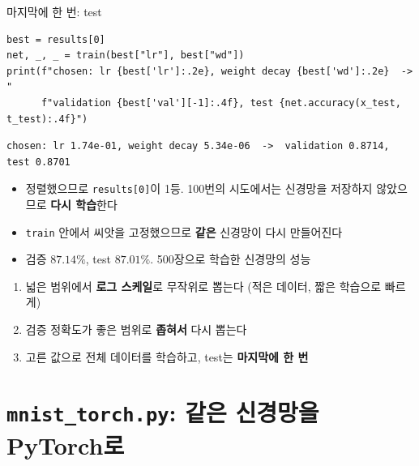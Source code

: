 \documentclass[aspectratio=169,11pt]{beamer}
\newcommand{\code}[1]{\texttt{#1}}
\begin{document}
\begin{frame}{마지막에 한 번: test}
\small
\begin{lstlisting}
best = results[0]
net, _, _ = train(best["lr"], best["wd"])
print(f"chosen: lr {best['lr']:.2e}, weight decay {best['wd']:.2e}  ->  "
      f"validation {best['val'][-1]:.4f}, test {net.accuracy(x_test, t_test):.4f}")
\end{lstlisting}
\begin{lstlisting}[style=outstyle]
chosen: lr 1.74e-01, weight decay 5.34e-06  ->  validation 0.8714, test 0.8701
\end{lstlisting}
\begin{itemize}
\item 정렬했으므로 \code{results[0]}이 1등. 100번의 시도에서는 신경망을 저장하지 않았으므로 \textbf{다시 학습}한다
\item \code{train} 안에서 씨앗을 고정했으므로 \textbf{같은} 신경망이 다시 만들어진다
\item 검증 $87.14\%$, test $87.01\%$. 500장으로 학습한 신경망의 성능
\end{itemize}
\begin{keybox}
\small
\begin{enumerate}
\item 넓은 범위에서 \textbf{로그 스케일}로 무작위로 뽑는다 (적은 데이터, 짧은 학습으로 빠르게)
\item 검증 정확도가 좋은 범위로 \textbf{좁혀서} 다시 뽑는다
\item 고른 값으로 전체 데이터를 학습하고, test는 \textbf{마지막에 한 번}
\end{enumerate}
\end{keybox}
\end{frame}

\section{\texttt{mnist\_torch.py}: 같은 신경망을 PyTorch로}
\end{document}
